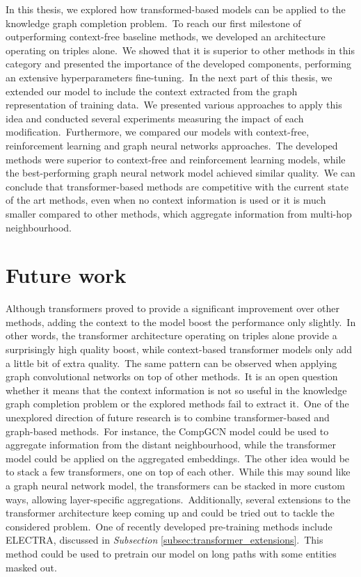 \documentclass[longabstract, english, mgr]{iithesis}
\theoremstyle{default_theorem_style}\newtheorem{theorem}{Theorem}
\theoremstyle{default_theorem_style}\newtheorem{definition}{Definition}
\begin{document}
In this thesis, we explored how transformed-based models can be applied to the knowledge graph completion
problem.\ To reach our first milestone of outperforming context-free baseline methods, we developed an architecture
operating on triples alone.\ We showed that it is superior to other methods in this category and presented the
importance of the developed components, performing an extensive hyperparameters fine-tuning.\ In the next part of this
thesis, we extended our model to include the context extracted from the graph representation of training data.\ We
presented various approaches to apply this idea and conducted several experiments measuring the impact of each
modification.\ Furthermore, we compared our models with context-free, reinforcement learning and graph neural networks
approaches.\ The developed methods were superior to context-free and reinforcement learning models, while the
best-performing graph neural network model achieved similar quality.\ We can conclude that transformer-based methods
are competitive with the current state of the art methods, even when no context information is used or it is much
smaller compared to other methods, which aggregate information from multi-hop neighbourhood.

\section{Future work}

Although transformers proved to provide a significant improvement over other methods, adding the context to the model
boost the performance only slightly.\ In other words, the transformer architecture operating on triples alone provide
a surprisingly high quality boost, while context-based transformer models only add a little bit of extra quality.\ The
same pattern can be observed when applying graph convolutional networks on top of other methods.\ It is an open
question whether it means that the context information is not so useful in the knowledge graph completion problem
or the explored methods fail to extract it.\ One of the unexplored direction of future research is to combine
transformer-based and graph-based methods.\ For instance, the CompGCN model could be used to aggregate information from
the distant neighbourhood, while the transformer model could be applied on the aggregated embeddings.\ The other idea
would be to stack a few transformers, one on top of each other.\ While this may sound like a graph neural network model,
the transformers can be stacked in more custom ways, allowing layer-specific aggregations.\ Additionally, several
extensions to the transformer architecture keep coming up and could be tried out to tackle the considered
problem.\ One of recently developed pre-training methods include ELECTRA, discussed in
\textit{Subsection} \ref{subsec:transformer_extensions}.\ This method could be used to pretrain our model on long paths
with some entities masked out.
\end{document}
